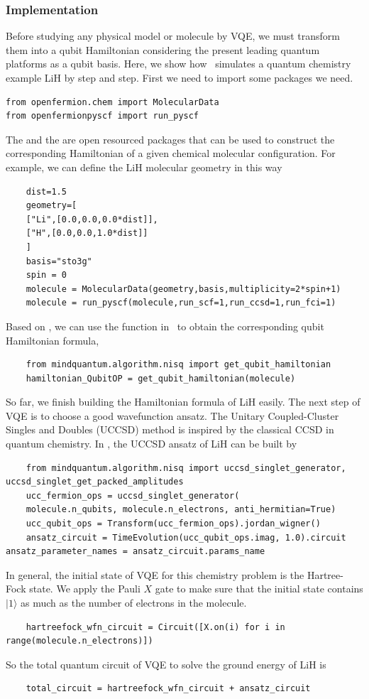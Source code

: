 \subsubsection{Implementation}

Before studying any physical model or molecule by VQE, we must transform them into a qubit Hamiltonian considering the present leading quantum platforms as a qubit basis.
Here, we show how \MindQuantum\ simulates a quantum chemistry example LiH by step and step.
First we need to import some packages we need.
\begin{lstlisting}
from openfermion.chem import MolecularData
from openfermionpyscf import run_pyscf
\end{lstlisting}
The  and the  are open resourced packages that can be used to construct the corresponding Hamiltonian of a given chemical molecular configuration. For example, we can define the LiH molecular geometry in this way
\begin{lstlisting}
    dist=1.5
    geometry=[
    ["Li",[0.0,0.0,0.0*dist]],
    ["H",[0.0,0.0,1.0*dist]]
    ]
    basis="sto3g"
    spin = 0
    molecule = MolecularData(geometry,basis,multiplicity=2*spin+1)
    molecule = run_pyscf(molecule,run_scf=1,run_ccsd=1,run_fci=1)
\end{lstlisting}
Based on , we can use the function in \MindQuantum\ to obtain the corresponding qubit Hamiltonian formula,
\begin{lstlisting}
    from mindquantum.algorithm.nisq import get_qubit_hamiltonian
    hamiltonian_QubitOP = get_qubit_hamiltonian(molecule)
\end{lstlisting}
So far, we finish building the Hamiltonian formula of LiH easily.
The next step of VQE is to choose a good wavefunction ansatz. The Unitary Coupled-Cluster Singles and Doubles (UCCSD) method is inspired by the classical CCSD in quantum chemistry. In \MindQuantum, the UCCSD ansatz of LiH can be built by
\begin{lstlisting}
    from mindquantum.algorithm.nisq import uccsd_singlet_generator, uccsd_singlet_get_packed_amplitudes
    ucc_fermion_ops = uccsd_singlet_generator(
    molecule.n_qubits, molecule.n_electrons, anti_hermitian=True)
    ucc_qubit_ops = Transform(ucc_fermion_ops).jordan_wigner()
    ansatz_circuit = TimeEvolution(ucc_qubit_ops.imag, 1.0).circuit
ansatz_parameter_names = ansatz_circuit.params_name
\end{lstlisting}
In general, the initial state of VQE for this chemistry problem is the Hartree-Fock state. We apply the Pauli $X$ gate to make sure that the initial state contains $|1\rangle$ as much as the number of electrons in the molecule.
\begin{lstlisting}
    hartreefock_wfn_circuit = Circuit([X.on(i) for i in range(molecule.n_electrons)])
\end{lstlisting}
So the total quantum circuit of VQE to solve the ground energy of LiH is
\begin{lstlisting}
    total_circuit = hartreefock_wfn_circuit + ansatz_circuit
\end{lstlisting}

